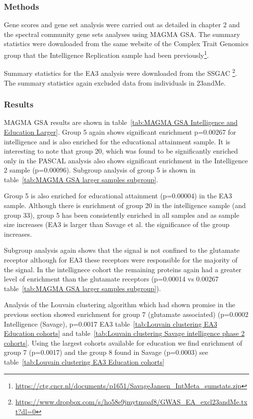 \subsubsection{Methods}

Gene scores and gene set analysis were carried out as detailed in chapter 2 and the spectral community gene sets analyses using MAGMA GSA. The summary statistics were downloaded from the same website of the Complex Trait Genomics group that the Intelligence Replication sample had been previously\footnote{\url{https://ctg.cncr.nl/documents/p1651/SavageJansen_IntMeta_sumstats.zip}}.

Summary statistics for the EA3 analysis were downloaded from the SSGAC \footnote{\url{https://www.dropbox.com/s/ho58e9jmytmpaf8/GWAS_EA_excl23andMe.txt?dl=0}}. The summary statistics again excluded data from individuals in 23andMe. 




\subsubsection{Results}
\label{sec:results checking findings}
MAGMA GSA results are shown in table~\ref{tab:MAGMA GSA Intelligence and Education Larger}. Group 5 again shows significant enrichment p=0.00267 for intelligence and is also enriched for the educational attainment sample. It is interesting to note that group 20, which was found to be significantly enriched only in the PASCAL analysis also shows significant enrichment in the Intelligence 2 sample (p=0.00096). Subgroup analysis of group 5 is shown in table~\ref{tab:MAGMA GSA larger samples subgroup}.

Group 5 is also enriched for educational attainment (p=0.00004) in the EA3 sample. Although there is enrichment of group 20 in the intelligence sample (and group 33), group 5 has been consistently enriched in all samples and as sample size increases (EA3 is larger than Savage et al.\cite{savage2018genome}\cite{lee2018gene} the significance of the group increases. 

Subgroup analysis again shows that the signal is not confined to the glutamate receptor although for EA3 these receptors were responsible for the majority of the signal. In the intellignece cohort the remaining proteins again had a greater level of enrichment than the glutamate receptors (p=0.00014 vs 0.00267 table~\ref{tab:MAGMA GSA larger samples subgroup}).

Analysis of the Louvain clustering algorithm which had shown promise in the previous section showed enrichment for group 7 (glutamate associated) (p=0.0002 Intelligence (Savage), p=0.0017 EA3 table~\ref{tab:Louvain clustering EA3 Education cohorts} and table~\ref{tab:Louvain clustering Savage intelligence phase 2 cohorts}. Using the largest cohorts available for education we find enrichment of group 7 (p=0.0017) and the group 8 found in Savage (p=0.0003) see table~\ref{tab:Louvain clustering EA3 Education cohorts}


